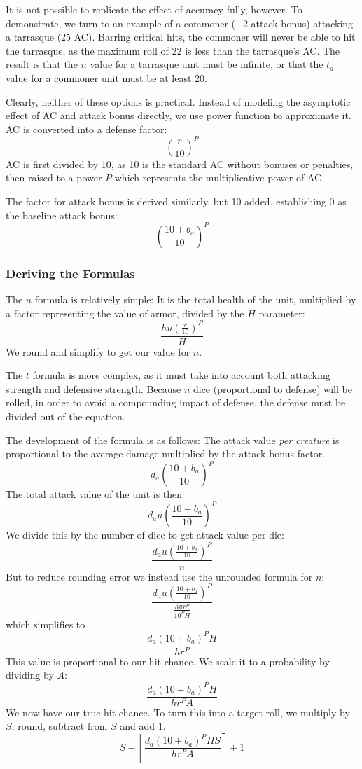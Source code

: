 \documentclass[twocolumn]{article}
\begin{document}
It is not possible to replicate the effect of accuracy fully, however.
To demonstrate, we turn to an example of a commoner (+2 attack bonus)
attacking a tarrasque (25 AC).
Barring critical hits, the commoner will never be able to hit the tarrasque,
as the maximum roll of 22 is less than the tarrasque's AC.
The result is that the $n$ value for a tarrasque unit must be infinite,
or that the $t_a$ value for a commoner unit must be at least 20.

Clearly, neither of these options is practical.
Instead of modeling the asymptotic effect of AC and attack bonus directly,
we use power function to approximate it.
AC is converted into a defense factor:
\[
    \left(\frac{r}{10}\right)^P
\]
AC is first divided by 10,
as 10 is the standard AC without bonuses or penalties,
then raised to a power $P$ which represents the multiplicative power of AC.

The factor for attack bonus is derived similarly,
but 10 added, establishing 0 as the baseline attack bonus:
\[
    \left(\frac{10 + b_a}{10}\right)^P
\]

\subsubsection{Deriving the Formulas}

The $n$ formula is relatively simple:
It is the total health of the unit,
multiplied by a factor representing the value of armor,
divided by the $H$ parameter:
\[
    \frac
        {h u (\frac{r}{10})^P}
        {H}
\]
We round and simplify to get our value for $n$.

The $t$ formula is more complex,
as it must take into account both attacking strength and defensive strength.
Because $n$ dice (proportional to defense) will be rolled,
in order to avoid a compounding impact of defense,
the defense must be divided out of the equation.

The development of the formula is as follows:
The attack value \emph{per creature} is proportional to
the average damage multiplied by the attack bonus factor.
\[
    d_a \left(\frac{10 + b_{a}}{10}\right)^{P}
\]
The total attack value of the unit is then 
\[
    d_a u \left(\frac{10 + b_{a}}{10}\right)^{P}
\]
We divide this by the number of dice to get attack value per die: 
\[
    \frac
        {d_a u \left(\frac{10 + b_{a}}{10}\right)^{P}}
        {n}
\]
But to reduce rounding error we instead use the unrounded formula for $n$: 
\[
    \frac
        {d_a u \left(\frac{10 + b_{a}}{10}\right)^{P}}
        {\frac{h u r^P}{10^P H}}
\]
which simplifies to 
\[
    \frac
        {d_a (10 + b_{a})^P H}
        {h r^P}
\]
This value is proportional to our hit chance.
We scale it to a probability by dividing by $A$:
\[
    \frac
        {d_a (10 + b_{a})^P H}
        {h r^P A}
\]
We now have our true hit chance.
To turn this into a target roll,
we multiply by $S$, round, subtract from $S$ and add 1.
\[
    S -
    \left\lfloor
        \frac
            {d_a (10 + b_{a})^P H S}
            {h r^P A}
    \right\rceil
    + 1
\]
\end{document}
